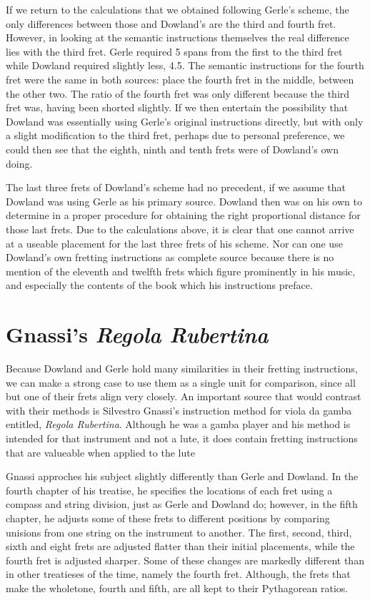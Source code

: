 If we return to the calculations that we obtained following Gerle's scheme, the
only differences between those and Dowland's are the third and fourth fret.
However, in looking at the semantic instructions themselves the real difference
lies with the third fret.  Gerle required 5 spans from the first to the third
fret while Dowland required slightly less, 4.5.  The semantic instructions for
the fourth fret were the same in both sources: place the fourth fret in the
middle, between the other two.  The ratio of the fourth fret was only different
because the third fret was, having been shorted slightly.  If we then entertain
the possibility that Dowland was essentially using Gerle's original instructions
directly, but with only a slight modification to the third fret, perhaps due to
personal preference, we could then see that the eighth, ninth and tenth frets
were of Dowland's own doing.

The last three frets of Dowland's scheme had no precedent, if we assume that
Dowland was using Gerle as his primary source.  Dowland then was on his own to
determine in a proper procedure for obtaining the right proportional distance
for those last frets.  Due to the calculations above, it is clear that one
cannot arrive at a useable placement for the last three frets of his scheme.
Nor can one use Dowland's own fretting instructions as complete source because
there is no mention of the eleventh and twelfth frets which figure prominently
in his music, and especially the contents of the book which his instructions
preface.

\section{Gnassi's \textit{Regola Rubertina}}

Because Dowland and Gerle hold many similarities in their fretting instructions, we can make
a strong case to use them as a single unit for comparison, since all but one of their frets
align very closely.  An important source that would contrast with their methods is Silvestro Gnassi's
instruction method for viola da gamba entitled, \textit{Regola Rubertina}.
Although he was a gamba player and his method is intended for
that instrument and not a lute, it does contain fretting instructions that are valueable
when applied to the lute

Gnassi approches his subject slightly differently than Gerle and Dowland.  In the fourth chapter
of his treatise, he specifies the locations of each fret using a compass and string division,
just as Gerle and Dowland do; however, in the fifth chapter, he adjusts some of these frets to different
positions by comparing unisions from one string on the instrument to another.  The first, second,
third, sixth and eight frets are adjusted flatter than their initial placements, while the fourth
fret is adjusted sharper.  Some of these changes are markedly different than in other treatieses
of the time, namely the fourth fret.  Although, the frets that make the wholetone, fourth
and fifth, are all kept to their Pythagorean ratios.

